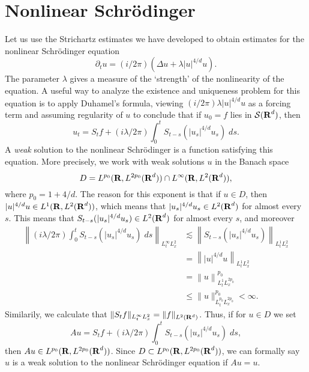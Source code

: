 \section{Nonlinear Schr\"{o}dinger}

Let us use the Strichartz estimates we have developed to obtain estimates for the nonlinear Schr\"{o}dinger equation
%
\[ \partial_t u = (i/2\pi)(\Delta u + \lambda |u|^{4/d} u). \]
%
The parameter $\lambda$ gives a measure of the `strength' of the nonlinearity of the equation. A useful way to analyze the existence and uniqueness problem for this equation is to apply Duhamel's formula, viewing $(i/2\pi) \lambda |u|^{4/d} u$ as a forcing term and assuming regularity of $u$ to conclude that if $u_0 = f$ lies in $\mathcal{S}(\operatorname{\mathbf{R}}^d)$, then
%
\[ u_t = S_t f + (i\lambda/2\pi) \int_0^t S_{t-s}(|u_s|^{4/d} u_s)\; ds. \]
%
A \emph{weak} solution to the nonlinear Schr\"{o}dinger is a function satisfying this equation. More precisely, we work with weak solutions $u$ in the Banach space
%
\[ D = L^{p_0}(\operatorname{\mathbf{R}}, L^{2p_0}(\operatorname{\mathbf{R}}^d)) \cap L^\infty(\operatorname{\mathbf{R}}, L^2(\operatorname{\mathbf{R}}^d)), \]
%
where $p_0 = 1 + 4/d$. The reason for this exponent is that if $u \in D$, then $|u|^{4/d} u \in L^1(\operatorname{\mathbf{R}},L^2(\operatorname{\mathbf{R}}^d))$, which means that $|u_s|^{4/d} u_s \in L^2(\operatorname{\mathbf{R}}^d)$ for almost every $s$. This means that $S_{t-s}(|u_s|^{4/d} u_s) \in L^2(\operatorname{\mathbf{R}}^d)$ for almost every $s$, and moreover
%
\begin{align*}
    \left\| (i\lambda/2\pi) \int_0^t S_{t-s}(|u_s|^{4/d} u_s)\; ds \right\|_{L^\infty_t L^2_x} &\lesssim \left\| S_{t-s}(|u_s|^{4/d} u_s) \right\|_{L^1_t L^2_x}\\
    &= \left\| |u|^{4/d} u \right\|_{L^1_t L^2_x}\\
    &= \left\| u \right\|_{L^1_t L^{2p_0}_x}^{p_0}\\
    &\leq \| u \|_{L^{p_0}_t L^{2p_0}_x}^{p_0} < \infty.
\end{align*}
%
Similarily, we calculate that $\| S_t f \|_{L^\infty_t L^2_x} = \| f \|_{L^2(\operatorname{\mathbf{R}}^d)}$. Thus, if for $u \in D$ we set
%
\[ Au = S_t f + (i\lambda/2\pi) \int_0^t S_{t-s}(|u_s|^{4/d} u_s)\; ds, \]
%
then $Au \in L^{p_0}(\operatorname{\mathbf{R}},L^{2p_0}(\operatorname{\mathbf{R}}^d))$. Since $D \subset L^{p_0}(\operatorname{\mathbf{R}},L^{2p_0}(\operatorname{\mathbf{R}}^d))$, we can formally say $u$ is a weak solution to the nonlinear Schr\"{o}dinger equation if $Au = u$.

